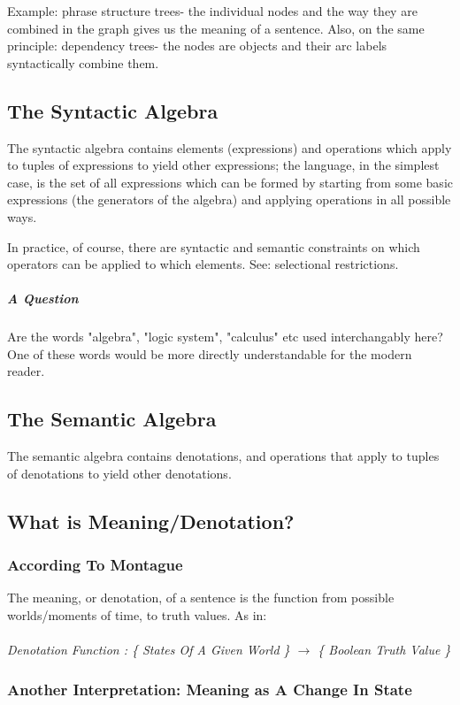 \documentclass[letterpaper,12pt]{article}
\begin{document}
Example: phrase structure trees- the individual nodes and the way they are combined in the graph gives us the meaning of a sentence. Also, on the same principle: dependency trees- the nodes are objects and their arc labels syntactically combine them.

\subsection{The Syntactic Algebra}

The syntactic algebra contains elements (expressions) and operations which apply to tuples of expressions to yield other expressions; the language, in the simplest case, is the set of all expressions which can be formed by starting from some basic expressions (the generators of the algebra) and applying operations in all possible ways.

In practice, of course, there are syntactic and semantic constraints on which operators can be applied to which elements. See: selectional restrictions.

\subparagraph{A Question}
Are the words "algebra", "logic system", "calculus" etc used interchangably here? One of these words would be more directly understandable for the modern reader.

\subsection{The Semantic Algebra}

The semantic algebra contains denotations, and operations that apply to tuples of denotations to yield other denotations.

\subsection{What is Meaning/Denotation?}

\subsubsection{According To Montague}

The meaning, or denotation, of a sentence is the function from possible worlds/moments of time, to truth values. As in: \\
\\
\textit{Denotation Function : \{ States Of A Given World \} $\rightarrow$ \{ Boolean Truth Value \} }

\subsubsection{Another Interpretation: Meaning as A Change In State}
\end{document}
